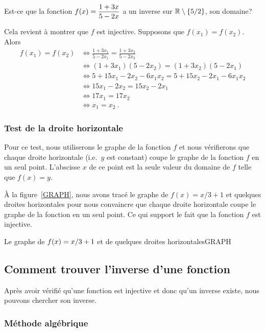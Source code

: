 {\begin{egg}
Est-ce que la fonction $\displaystyle f(x) = \frac{1+3x}{5-2x}$ a un
inverse sur $\mathbb{R} \setminus \{5/2\}$, son domaine?

Cela revient à montrer que $f$ est injective.  Supposons que
$f(x_1) = f(x_2)$.  Alors
\begin{align*}
f(x_1) = f(x_2) & \Leftrightarrow \frac{1+3x_1}{5-2x_1}
= \frac{1+3x_2}{5-2x_2} \\
&\Leftrightarrow (1+3x_1)(5-2x_2) = (1+3x_2)(5-2x_1) \\
&\Leftrightarrow 5+15x_1-2x_2 -6 x_1x_2 = 5+ 15 x_2 -2x_1 - 6x_1 x_2 \\
&\Leftrightarrow 15x_1-2x_2= 15 x_2 -2x_1 \\
&\Leftrightarrow 17x_1 = 17 x_2 \\
&\Leftrightarrow x_1 = x_2  \ .
\end{align*}
\label{invEGG}
\end{egg}

\subsubsection{Test de la droite horizontale}

Pour ce test, nous utiliserons le graphe de la fonction $f$ et nous
vérifierons que chaque droite horizontale (i.e.\ $y$ est constant) coupe
le graphe de la fonction $f$ en un seul point.  L'abscisse $x$ de ce
point est la seule valeur du domaine de $f$ telle que $f(x) = y$.

\begin{egg}
À la figure~\ref{GRAPH}, nous avons tracé le graphe de $f(x) = x/3 +1$ et
quelques droites horizontales pour nous convaincre que chaque droite
horizontale coupe le graphe de la fonction en un seul point.  Ce qui
support le fait que la fonction $f$ est injective.
\end{egg}

{Le graphe de $\displaystyle f(x) = x/3 +1$ et de quelques droites
horizontales}{GRAPH}

\subsection{Comment trouver l'inverse d'une fonction}

Après avoir vérifié qu'une fonction est injective et donc qu'un
inverse existe, nous pouvons chercher son inverse.

\subsubsection{Méthode algébrique}

}
